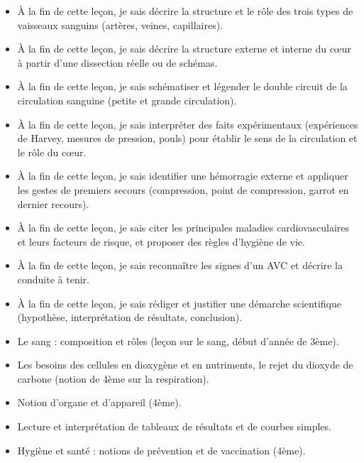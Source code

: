 \documentclass[11pt]{article}
\begin{document}
\begin{objectifs}
\begin{itemize}
\item À la fin de cette leçon, je sais décrire la structure et le rôle des trois types de vaisseaux sanguins (artères, veines, capillaires).
\item À la fin de cette leçon, je sais décrire la structure externe et interne du cœur à partir d'une dissection réelle ou de schémas.
\item À la fin de cette leçon, je sais schématiser et légender le double circuit de la circulation sanguine (petite et grande circulation).
\item À la fin de cette leçon, je sais interpréter des faits expérimentaux (expériences de Harvey, mesures de pression, pouls) pour établir le sens de la circulation et le rôle du cœur.
\item À la fin de cette leçon, je sais identifier une hémorragie externe et appliquer les gestes de premiers secours (compression, point de compression, garrot en dernier recours).
\item À la fin de cette leçon, je sais citer les principales maladies cardiovasculaires et leurs facteurs de risque, et proposer des règles d'hygiène de vie.
\item À la fin de cette leçon, je sais reconnaître les signes d'un AVC et décrire la conduite à tenir.
\item À la fin de cette leçon, je sais rédiger et justifier une démarche scientifique (hypothèse, interprétation de résultats, conclusion).
\end{itemize}
\end{objectifs}

\begin{prerequis}
\begin{itemize}
\item Le sang : composition et rôles (leçon sur le sang, début d'année de 3ème).
\item Les besoins des cellules en dioxygène et en nutriments, le rejet du dioxyde de carbone (notion de 4ème sur la respiration).
\item Notion d'organe et d'appareil (4ème).
\item Lecture et interprétation de tableaux de résultats et de courbes simples.
\item Hygiène et santé : notions de prévention et de vaccination (4ème).
\end{itemize}
\end{prerequis}
\end{document}
